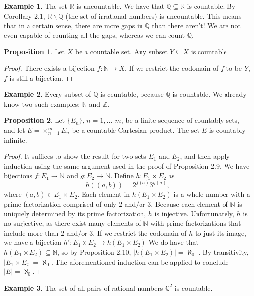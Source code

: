 \documentclass{article}
\newcommand{\N}{\mathbb{N}}
\newcommand{\R}{\mathbb{R}}
\newcommand{\Q}{\mathbb{Q}}
\newcommand{\Z}{\mathbb{Z}}
\theoremstyle{definition}
\newtheorem{proposition}{Proposition}[section]
\newtheorem{example}{Example}[section]
\begin{document}
	\begin{example}
		The set $ \R $ is uncountable. We have that $ \Q\subseteq \R $ is countable. By Corollary 2.1, $ \R\backslash \Q $ (the set of irrational numbers) is uncountable. This means that in a certain sense, there are more gaps in $ \Q $ than there aren't! We are not even capable of counting all the gaps, whereas we can count $ \Q $. 
	\end{example}
	\begin{proposition}
		Let $ X $ be a countable set. Any subset $ Y\subseteq X $ is countable
	\end{proposition}
	\begin{proof}
		There exists a bijection $ f:\N\to X $. If we restrict the codomain of $ f $ to be $ Y $, $ f $ is still a bijection. 
	\end{proof}
	\begin{example}
		Every subset of $ \Q $ is countable, because $ \Q $ is countable. We already know two such examples: $ \N $ and $ \Z $. 
	\end{example}
	\begin{proposition}
		Let $ \{E_n\} $, $ n=1,\ldots,m $, be a finite sequence of countably sets, and let $ E=\times_{n=1}^mE_n $ be a countable Cartesian product. The set $ E $ is countably infinite. 
	\end{proposition}
	\begin{proof}
		It suffices to show the result for two sets $ E_1 $ and $ E_2 $, and then apply induction using the same argument used in the proof of Proposition 2.9. We have bijections $ f:E_1\to\N$ and $ g:E_2\to\N $. Define $ h:E_1\times E_2 $ as $$ h((a,b))=2^{f(a)}3^{g(a)},$$ where $ (a,b)\in E_1\times E_2 $. Each element in $ h(E_1\times E_2) $ is a whole number with a prime factorization comprised of only $ 2 $ and/or $ 3 $. Because each element of $ \N $ is uniquely determined by its prime factorization, $ h $ is injective. Unfortunately, $ h $ is no surjective, as there exist many elements of $ \N $ with prime factorizations that include more than $ 2 $ and/or $ 3 $. If we restrict the codomain of $ h $ to just its image, we have a bijection $ h':E_1\times E_2\to  h(E_1\times E_2) $  We do have that $ h(E_1\times E_2)\subseteq \N  $, so by Proposition 2.10, $ |h(E_1\times E_2)|=\aleph_0 $ . By transitivity, $ |E_1\times E_2|=\aleph_0 $. The aforementioned induction can be applied to conclude $ |E|=\aleph_0 $. 
	\end{proof}
	\begin{example}
		The set of all pairs of rational numbers $ \Q^2 $ is countable.
	\end{example}
\end{document}
